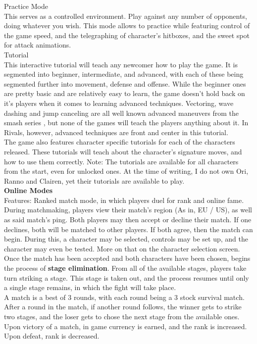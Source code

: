 \documentclass{article}
\begin{document}
Practice Mode\\
This serves as a controlled environment. Play against any number of opponents, doing whatever you wish. This mode allows to practice while featuring control of the game speed, and the telegraphing of character's hitboxes, and the sweet spot for attack animations.\\

Tutorial\\
This interactive tutorial will teach any newcomer how to play the game. It is segmented into beginner, intermediate, and advanced, with each of these being segmented further into movement, defense and offense. While the beginner ones are pretty basic and are relatively easy to learn, the game doesn't hold back on it's players when it comes to learning advanced techniques. Vectoring, wave dashing and jump canceling are all well known advanced maneuvers from the smash series \cite{atomic2017:2} \cite{manual:3}, %
but none of the games will teach the players anything about it. In Rivals, however, advanced techniques are front and center in this tutorial.\\
The game also features character specific tutorials for each of the characters released. These tutorials will teach about the character's signature moves, and how to use them correctly. Note: The tutorials are available for all characters from the start, even for unlocked ones. At the time of writing, I do not own Ori, Ranno and Clairen, yet their tutorials are available to play.\\

\textbf{Online Modes}\\
Features: Ranked match mode, in which players duel for rank and online fame. During matchmaking, players view their match's region (As in, EU / US), as well as said match's ping. Both players may then accept or decline their match. If one declines, both will be matched to other players. If both agree, then the match can begin. During this, a character may be selected, controls may be set up, and the character may even be tested. More on that on the character selection screen.\\
Once the match has been accepted and both characters have been chosen, begins the process of \textbf{stage elimination}. From all of the available stages, players take turn striking a stage. This stage is taken out, and the process resumes until only a single stage remains, in which the fight will take place.\\
A match is a best of 3 rounds, with each round being a 3 stock survival match. After a round in the match, if another round follows, the winner gets to strike two stages, and the loser gets to chose the next stage from the available ones.\\
Upon victory of a match, in game currency is earned, and the rank is increased. Upon defeat, rank is decreased.\\
\end{document}
